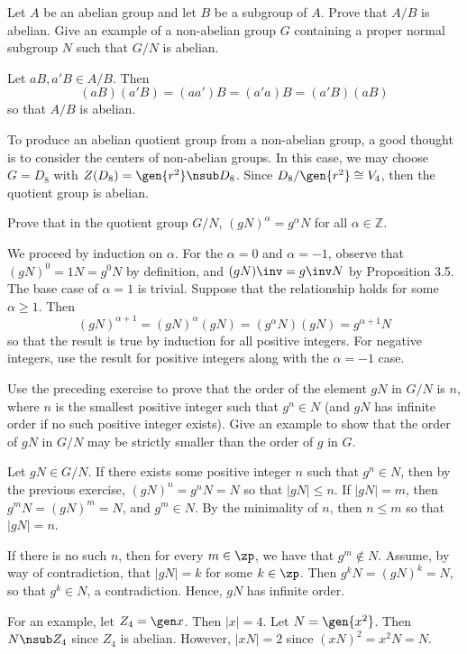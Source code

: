 \begin{exercise}\label{ex3.1.3}
    Let $A$ be an abelian group and let $B$ be a subgroup of $A$. Prove that $A/B$ is abelian. Give an example of a non-abelian group $G$ containing a proper normal subgroup $N$ such that $G/N$ is abelian.
\end{exercise}

\begin{sol}
    Let $aB, a'B \in A/B$. Then
    \[(aB)(a'B) = (aa')B = (a'a)B = (a'B)(aB)\]
    so that $A/B$ is abelian.

    To produce an abelian quotient group from a non-abelian group, a good thought is to consider the centers of non-abelian groups. In this case, we may choose $G = D_8$ with $Z(D_8) = \gen{r^2} \nsub D_8$. Since $D_8/\gen{r^2} \cong V_4$, then the quotient group is abelian.
\end{sol}

\begin{exercise}\label{ex3.1.4}
    Prove that in the quotient group $G/N$, $(gN)^{\alpha} = g^{\alpha}N$ for all $\alpha \in \mathbb{Z}$.
\end{exercise}

\begin{sol}
    We proceed by induction on $\alpha$. For the $\alpha = 0$ and $\alpha = -1$, observe that $(gN)^0 = 1N = g^0N$ by definition, and $(gN)\inv = g\inv N$ by Proposition 3.5. The base case of $\alpha = 1$ is trivial. Suppose that the relationship holds for some $\alpha \geq 1$. Then
    \[(gN)^{\alpha + 1} = (gN)^{\alpha}(gN) = (g^{\alpha}N)(gN) = g^{\alpha + 1}N\]
    so that the result is true by induction for all positive integers. For negative integers, use the result for positive integers along with the $\alpha = -1$ case.
\end{sol}

\begin{exercise}\label{ex3.1.5}
    Use the preceding exercise to prove that the order of the element $gN$ in $G/N$ is $n$, where $n$ is the smallest positive integer such that $g^n \in N$ (and $gN$ has infinite order if no such positive integer exists). Give an example to show that the order of $gN$ in $G/N$ may be strictly smaller than the order of $g$ in $G$.
\end{exercise}

\begin{sol}
    Let $gN \in G/N$. If there exists some positive integer $n$ such that $g^n \in N$, then by the previous exercise, $(gN)^n = g^n N = N$ so that $|gN| \leq n$. If $|gN| = m$, then $g^mN = (gN)^m = N$, and $g^m \in N$. By the minimality of $n$, then $n \leq m$ so that $|gN| = n$.

    If there is no such $n$, then for every $m \in \zp$, we have that $g^m \not\in N$. Assume, by way of contradiction, that $|gN| = k$ for some $k \in \zp$. Then $g^kN = (gN)^k = N$, so that $g^k \in N$, a contradiction. Hence, $gN$ has infinite order.

    For an example, let $Z_4 = \gen x$. Then $|x| = 4$. Let $N = \gen{x^2}$. Then $N \nsub Z_4$ since $Z_4$ is abelian. However, $|xN| = 2$ since $(xN)^2 = x^2N = N$.
\end{sol}

